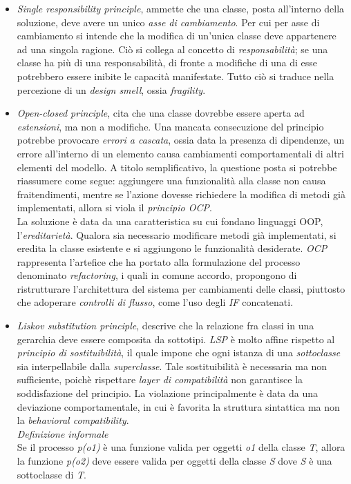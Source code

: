 \documentclass{article}
\begin{document}
\begin{itemize}[label={-}]
    \itemsep0em
    \item \textit{Single responsibility principle}, ammette che una classe, posta all'interno della soluzione, deve avere un unico \textit{asse di cambiamento}. Per cui per asse di cambiamento si intende che la modifica di un'unica classe deve appartenere ad una singola ragione. Ciò si collega al concetto di \textit{responsabilità}; se una classe ha più di una responsabilità, di fronte a modifiche di una di esse potrebbero essere inibite le capacità manifestate. Tutto ciò si traduce nella percezione di un \textit{design smell}, ossia \textit{fragility}. 
    \item \textit{Open-closed principle}, cita che una classe dovrebbe essere aperta ad \textit{estensioni}, ma non a modifiche. Una mancata consecuzione del principio potrebbe provocare \textit{errori a cascata}, ossia data la presenza di dipendenze, un errore all'interno di un elemento causa cambiamenti comportamentali di altri elementi del modello. A titolo semplificativo, la questione posta si potrebbe riassumere come segue: aggiungere una funzionalità alla classe non causa fraitendimenti, mentre se l'azione dovesse richiedere la modifica di metodi già implementati, allora si viola il \textit{principio OCP}.\vspace*{14pt}\\ La soluzione è data da una caratteristica su cui fondano linguaggi OOP, l'\textit{ereditarietà}. Qualora sia necessario modificare metodi già implementati, si eredita la classe esistente e si aggiungono le funzionalità desiderate. \textit{OCP} rappresenta l'artefice che ha portato alla formulazione del processo denominato \textit{refactoring}, i quali in comune accordo, propongono di ristrutturare l'architettura del sistema per cambiamenti delle classi, piuttosto che adoperare \textit{controlli di flusso}, come l'uso degli \textit{IF} concatenati. 
    \item \textit{Liskov substitution principle}, descrive che la relazione fra classi in una gerarchia deve essere composita da sottotipi. \textit{LSP} è molto affine rispetto al \textit{principio di sostituibilità}, il quale impone che ogni istanza di una \textit{sottoclasse} sia interpellabile dalla \textit{superclasse}. Tale sostituibilità è necessaria ma non sufficiente, poichè rispettare \textit{layer di compatibilità} non garantisce la soddisfazione del principio. La violazione principalmente è data da una deviazione comportamentale, in cui è favorita la struttura sintattica ma non la \textit{behavioral compatibility}.\vspace*{14pt}\\ \textit{Definizione informale}\\Se il processo \textit{p(o1)} è una funzione valida per oggetti \textit{o1} della classe \textit{T}, allora la funzione \textit{p(o2)} deve essere valida per oggetti della classe \textit{S} dove \textit{S} è una sottoclasse di \textit{T}.

\end{itemize}
\end{document}
